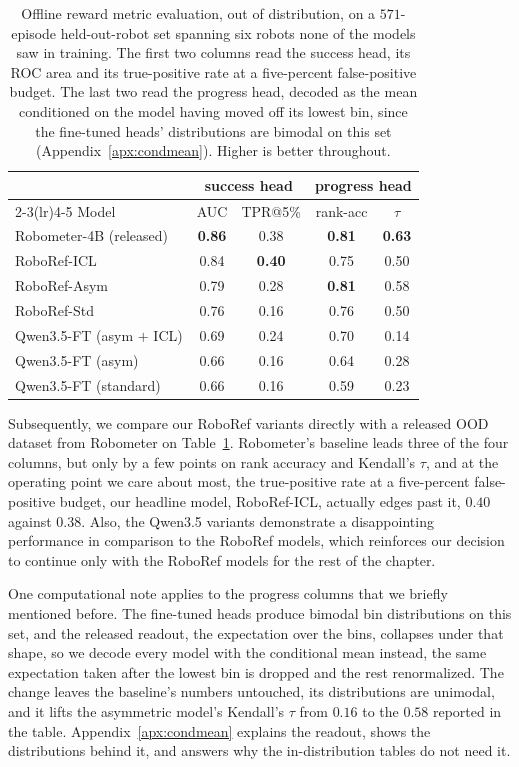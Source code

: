 \begin{table}[h]
\centering\footnotesize
\caption[Offline reward metric evaluation, out of distribution]{Offline reward metric evaluation, out of distribution, on a $571$-episode held-out-robot set spanning six robots none of the models saw in training. The first two columns read the success head, its ROC area and its true-positive rate at a five-percent false-positive budget. The last two read the progress head, decoded as the mean conditioned on the model having moved off its lowest bin, since the fine-tuned heads' distributions are bimodal on this set (Appendix~\ref{apx:condmean}). Higher is better throughout.}
\label{tab:offline-ood}
\setlength{\tabcolsep}{3.5pt}
\begin{tabular}{@{}lcccc@{}}
\toprule
 & \multicolumn{2}{c}{success head} & \multicolumn{2}{c}{progress head} \\
\cmidrule(lr){2-3}\cmidrule(lr){4-5}
Model & AUC & TPR@5\% & rank-acc & $\tau$ \\
\midrule
Robometer-4B (released) & \textbf{0.86} & 0.38 & \textbf{0.81} & \textbf{0.63} \\
RoboRef-ICL & 0.84 & \textbf{0.40} & 0.75 & 0.50 \\
RoboRef-Asym & 0.79 & 0.28 & \textbf{0.81} & 0.58 \\
RoboRef-Std & 0.76 & 0.16 & 0.76 & 0.50 \\
Qwen3.5-FT (asym $+$ ICL) & 0.69 & 0.24 & 0.70 & 0.14 \\
Qwen3.5-FT (asym) & 0.66 & 0.16 & 0.64 & 0.28 \\
Qwen3.5-FT (standard) & 0.66 & 0.16 & 0.59 & 0.23 \\
\bottomrule
\end{tabular}
\end{table}

Subsequently, we compare our RoboRef variants directly with a released OOD dataset from Robometer on Table~\ref{tab:offline-ood}. Robometer's baseline leads three of the four columns, but only by a few points on rank accuracy and Kendall's $\tau$, and at the operating point we care about most, the true-positive rate at a five-percent false-positive budget, our headline model, RoboRef-ICL, actually edges past it, $0.40$ against $0.38$. Also, the Qwen3.5 variants demonstrate a disappointing performance in comparison to the RoboRef models, which reinforces our decision to continue only with the RoboRef models for the rest of the chapter.


One computational note applies to the progress columns that we briefly mentioned before. The fine-tuned heads produce bimodal bin distributions on this set, and the released readout, the expectation over the bins, collapses under that shape, so we decode every model with the conditional mean instead, the same expectation taken after the lowest bin is dropped and the rest renormalized. The change leaves the baseline's numbers untouched, its distributions are unimodal, and it lifts the asymmetric model's Kendall's $\tau$ from $0.16$ to the $0.58$ reported in the table. Appendix~\ref{apx:condmean} explains the readout, shows the distributions behind it, and answers why the in-distribution tables do not need it.

